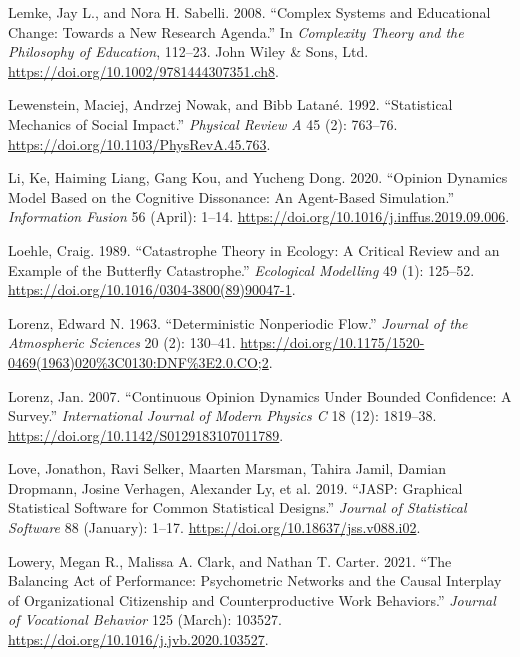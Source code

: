 \documentclass[
  a4paper,
  DIV=11,
  numbers=noendperiod,
  oneside]{scrreprt}
\newlength{\cslhangindent}
\newenvironment{CSLReferences}[2] %
 {\begin{list}{}{%
  \setlength{\itemindent}{0pt}
  \setlength{\leftmargin}{0pt}
  \setlength{\parsep}{0pt}
  \ifodd #1
   \setlength{\leftmargin}{\cslhangindent}
   \setlength{\itemindent}{-1\cslhangindent}
  \fi
  \setlength{\itemsep}{#2\baselineskip}}}
 {\end{list}}
\begin{document}
\begin{CSLReferences}{1}{0}
Lemke, Jay L., and Nora H. Sabelli. 2008. {``Complex {Systems} and
{Educational Change}: {Towards} a {New Research Agenda}.''} In
\emph{Complexity {Theory} and the {Philosophy} of {Education}}, 112--23.
{John Wiley \& Sons, Ltd}.
\url{https://doi.org/10.1002/9781444307351.ch8}.

Lewenstein, Maciej, Andrzej Nowak, and Bibb Latané. 1992. {``Statistical
Mechanics of Social Impact.''} \emph{Physical Review A} 45 (2): 763--76.
\url{https://doi.org/10.1103/PhysRevA.45.763}.

Li, Ke, Haiming Liang, Gang Kou, and Yucheng Dong. 2020. {``Opinion
Dynamics Model Based on the Cognitive Dissonance: {An} Agent-Based
Simulation.''} \emph{Information Fusion} 56 (April): 1--14.
\url{https://doi.org/10.1016/j.inffus.2019.09.006}.

Loehle, Craig. 1989. {``Catastrophe Theory in Ecology: A Critical Review
and an Example of the Butterfly Catastrophe.''} \emph{Ecological
Modelling} 49 (1): 125--52.
\url{https://doi.org/10.1016/0304-3800(89)90047-1}.

Lorenz, Edward N. 1963. {``Deterministic {Nonperiodic Flow}.''}
\emph{Journal of the Atmospheric Sciences} 20 (2): 130--41.
\url{https://doi.org/10.1175/1520-0469(1963)020\%3C0130:DNF\%3E2.0.CO;2}.

Lorenz, Jan. 2007. {``Continuous Opinion Dynamics Under Bounded
Confidence: A Survey.''} \emph{International Journal of Modern Physics
C} 18 (12): 1819--38. \url{https://doi.org/10.1142/S0129183107011789}.

Love, Jonathon, Ravi Selker, Maarten Marsman, Tahira Jamil, Damian
Dropmann, Josine Verhagen, Alexander Ly, et al. 2019. {``{JASP}:
{Graphical Statistical Software} for {Common Statistical Designs}.''}
\emph{Journal of Statistical Software} 88 (January): 1--17.
\url{https://doi.org/10.18637/jss.v088.i02}.

Lowery, Megan R., Malissa A. Clark, and Nathan T. Carter. 2021. {``The
Balancing Act of Performance: {Psychometric} Networks and the Causal
Interplay of Organizational Citizenship and Counterproductive Work
Behaviors.''} \emph{Journal of Vocational Behavior} 125 (March): 103527.
\url{https://doi.org/10.1016/j.jvb.2020.103527}.


\end{CSLReferences}
\end{document}
